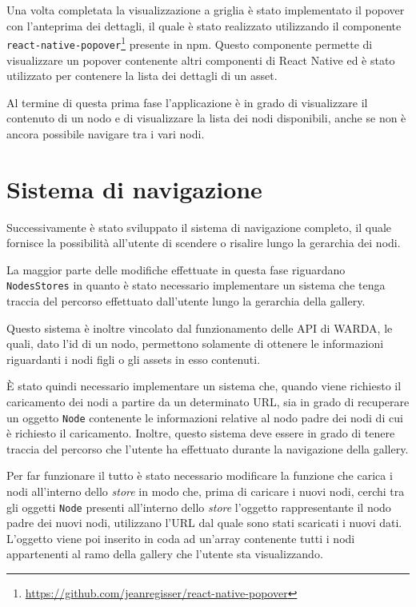 Una volta completata la visualizzazione a griglia è stato implementato il popover con l'anteprima dei dettagli, il quale è stato realizzato utilizzando il componente \texttt{react-native-popover}\footnote{\url{https://github.com/jeanregisser/react-native-popover}} presente in npm. 
Questo componente permette di visualizzare un popover contenente altri componenti di React Native ed è stato utilizzato per contenere la lista dei dettagli di un asset.

Al termine di questa prima fase l'applicazione è in grado di visualizzare il contenuto di un nodo e di visualizzare la lista dei nodi disponibili, anche se non è ancora possibile navigare tra i vari nodi.

\section{Sistema di navigazione}

Successivamente è stato sviluppato il sistema di navigazione completo, il quale fornisce la possibilità all'utente di scendere o risalire lungo la gerarchia dei nodi.

La maggior parte delle modifiche effettuate in questa fase riguardano \texttt{NodesStores} in quanto è stato necessario implementare un sistema che tenga traccia del percorso effettuato dall'utente lungo la gerarchia della gallery.

Questo sistema è inoltre vincolato dal funzionamento delle API di WARDA, le quali, dato l'id di un nodo, permettono solamente di ottenere le informazioni riguardanti i nodi figli o gli assets in esso contenuti.

\`E stato quindi necessario implementare un sistema che, quando viene richiesto il caricamento dei nodi a partire da un determinato URL, sia in grado di recuperare un oggetto \texttt{Node} contenente le informazioni relative al nodo padre dei nodi di cui è richiesto il caricamento.
Inoltre, questo sistema deve essere in grado di tenere traccia del percorso che l'utente ha effettuato durante la navigazione della gallery.

Per far funzionare il tutto è stato necessario modificare la funzione che carica i nodi all'interno dello \textit{store} in modo che, prima di caricare i nuovi nodi, cerchi tra gli oggetti \texttt{Node} presenti all'interno dello \textit{store} l'oggetto rappresentante il nodo padre dei nuovi nodi, utilizzano l'URL dal quale sono stati scaricati i nuovi dati.
L'oggetto viene poi inserito in coda ad un'array contenente tutti i nodi appartenenti al ramo della gallery che l'utente sta visualizzando.

